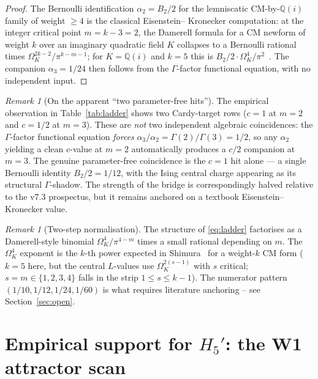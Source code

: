 \documentclass[a4paper,11pt]{article}
\newcommand{\OmK}{\Omega_K}
\newcommand{\Qi}{\mathbb{Q}(i)}
\theoremstyle{definition}
\theoremstyle{remark}
\newtheorem{remark}[theorem]{Remark}
\begin{document}
\begin{proof}
The Bernoulli identification $\alpha_2 = B_2/2$ for the lemniscatic
CM-by-$\Qi$ family of weight $\geq 4$ is the classical Eisenstein--%
Kronecker computation: at the integer critical point $m = k-3 = 2$,
the Damerell formula for a CM newform of weight $k$ over an imaginary
quadratic field $K$ collapses to a Bernoulli rational times
$\OmK^{2k-2}/\pi^{k-m-1}$; for $K = \Qi$ and $k=5$ this is
$B_2/2 \cdot \OmK^{4}/\pi^{2}$~\cite{Damerell71,Shimura76,HS86}.
The companion $\alpha_3 = 1/24$ then follows from the
$\Gamma$-factor functional equation, with no independent input.
\end{proof}

\begin{remark}[On the apparent ``two parameter-free hits'']
The empirical observation in Table~\ref{tab:ladder} shows two
Cardy-target rows ($c=1$ at $m=2$ and $c=1/2$ at $m=3$).  These are
\emph{not} two independent algebraic coincidences: the
$\Gamma$-factor functional equation \emph{forces} $\alpha_3 / \alpha_2
= \Gamma(2)/\Gamma(3) = 1/2$, so any $\alpha_2$ yielding a clean
$c$-value at $m=2$ automatically produces a $c/2$ companion at $m=3$.
The genuine parameter-free coincidence is the $c=1$ hit alone --- a
single Bernoulli identity $B_2/2 = 1/12$, with the Ising central
charge appearing as its structural $\Gamma$-shadow.  The strength of
the bridge is correspondingly halved relative to the v7.3 prospectus,
but it remains anchored on a textbook Eisenstein--Kronecker value.
\end{remark}

\begin{remark}[Two-step normalisation]
The structure of \eqref{eq:ladder} factorises as a Damerell-style
binomial $\OmK^{4}/\pi^{4-m}$ times a small rational depending on $m$.
The $\OmK^{4}$ exponent is the $k$-th power expected in
Shimura~\cite{Shimura76} for a weight-$k$ CM form ($k=5$ here, but
the central $L$-values use $\OmK^{2(s-1)}$ with $s$ critical;
$s=m\in\{1,2,3,4\}$ falls in the strip $1\le s\le k-1$).
The numerator pattern $(1/10,1/12,1/24,1/60)$ is what requires
literature anchoring -- see Section~\ref{sec:open}.
\end{remark}

\section{Empirical support for $H_5'$: the W1 attractor scan}
\label{sec:W1}
\end{document}
